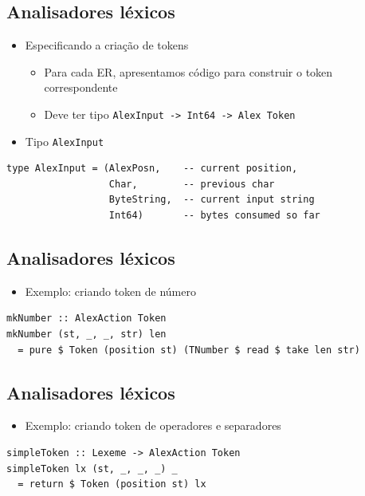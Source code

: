 \documentclass[11pt]{article}
\begin{document}
\subsection*{Analisadores léxicos}
\label{sec:org39ffbda}

\begin{itemize}
\item Especificando a criação de tokens
\begin{itemize}
\item Para cada ER, apresentamos código para construir o token correspondente
\item Deve ter tipo \texttt{AlexInput -> Int64 -> Alex Token}
\end{itemize}
\item Tipo \texttt{AlexInput}
\end{itemize}

\begin{verbatim}
type AlexInput = (AlexPosn,    -- current position,
                  Char,        -- previous char
                  ByteString,  -- current input string
                  Int64)       -- bytes consumed so far
\end{verbatim}
\subsection*{Analisadores léxicos}
\label{sec:org8352364}

\begin{itemize}
\item Exemplo: criando token de número
\end{itemize}

\begin{verbatim}
mkNumber :: AlexAction Token
mkNumber (st, _, _, str) len
  = pure $ Token (position st) (TNumber $ read $ take len str)
\end{verbatim}
\subsection*{Analisadores léxicos}
\label{sec:orgd088105}

\begin{itemize}
\item Exemplo: criando token de operadores e separadores
\end{itemize}

\begin{verbatim}
simpleToken :: Lexeme -> AlexAction Token
simpleToken lx (st, _, _, _) _
  = return $ Token (position st) lx
\end{verbatim}
\end{document}
